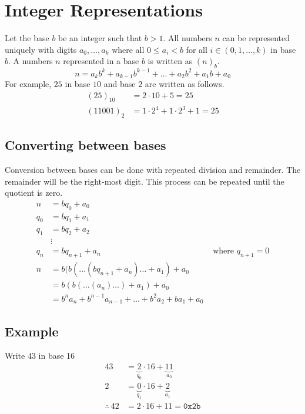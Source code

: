 \documentclass{article}
\theoremstyle{mytheoremstyle}
\theoremstyle{mytheoremstyle}
\theoremstyle{myproblemstyle}
\begin{document}
    \section*{Integer Representations}
    Let the base $b$ be an integer such that $b>1$.
    All numbers $n$ can be represented uniquely with digits $a_0,\dots,a_k$ where
    all $0\le a_i < b$ for all $i\in(0,1,\dots,k)$ in base $b$. A numbers $n$ represented
    in a base $b$ is written as $(n)_b$.
    \[
        n = a_kb^k + a_{k-1}b^{k-1} + \dots + a_2b^2 + a_1b + a_0
    \]
    For example, $25$ in base $10$ and base $2$ are written as follows.
    \begin{align*}
        (25)_{10} &= 2\cdot 10 + 5 = 25 \\
        (11001)_2 &= 1\cdot 2^4 + 1\cdot 2^3 + 1 = 25
    \end{align*}

    \subsection*{Converting between bases}
    Conversion between bases can be done with repeated division and remainder.
    The remainder will be the right-most digit. This process can be repeated
    until the quotient is zero.
    \begin{align*}
        n &= bq_0 + a_0 \\
        q_0 &= bq_1 + a_1 \\
        q_1 &= bq_2 + a_2 \\
        &\vdots \\
        q_{n} &= bq_{n+1} + a_n &\text{ where } q_{n+1} = 0 \\
        n &= b(b(\dots(b q_{n+1} + a_n)\dots + a_1) + a_0 \\
          &= b(b(\dots(a_n)\dots) + a_1) + a_0 \\
          &= b^{n}a_n + b^{n-1} a_{n-1} + \dots + b^2a_2 + ba_1 + a_0
    \end{align*}

    \subsection*{Example}
    Write 43 in base 16
    \begin{align*}
        43 &= \underbrace{2}_{q_0} \cdot 16 + \underbrace{11}_{a_0} \\
        2 &= \underbrace{0}_{q_1} \cdot 16 + \underbrace{2}_{a_1} \\
        \therefore \ 42 &= 2\cdot 16 + 11 = \texttt{0x2b}
    \end{align*}
\end{document}

